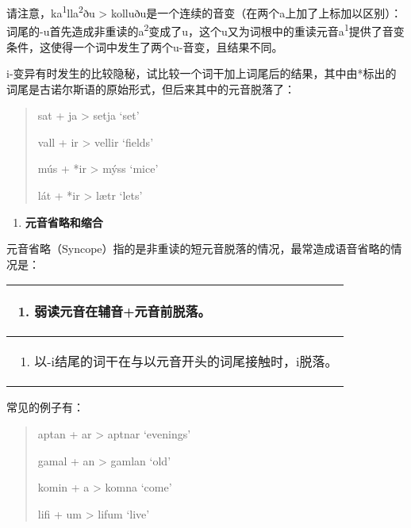 请注意，ka\textsuperscript{1}lla\textsuperscript{2}ðu \textgreater{}
kolluðu是一个连续的音变（在两个a上加了上标加以区别）：词尾的-u首先造成非重读的a\textsuperscript{2}变成了u，这个u又为词根中的重读元音a\textsuperscript{1}提供了音变条件，这使得一个词中发生了两个u-音变，且结果不同。

i-变异有时发生的比较隐秘，试比较一个词干加上词尾后的结果，其中由*标出的词尾是古诺尔斯语的原始形式，但后来其中的元音脱落了：

\begin{quote}
  sat + ja \textgreater{} setja `set'

  vall + ir \textgreater{} vellir `fields'

  mús + *ir \textgreater{} mýss `mice'

  lát + *ir \textgreater{} lætr `lets'
\end{quote}

\begin{enumerate}
  \def\labelenumi{\Alph{enumi}.}
  \setcounter{enumi}{1}
  \item
        \label{_Ref115693879}{}\textbf{元音省略和缩合}
\end{enumerate}

元音省略（Syncope）指的是非重读的短元音脱落的情况，最常造成语音省略的情况是：

\begin{longtable}{l}
  \toprule
  \begin{enumerate}\def\labelenumi{\arabic{enumi}.}\item  {}\label{_Ref115694569}{}弱读元音在辅音+元音前脱落。\end{enumerate} \\
  \midrule
  \endhead
  \bottomrule
  \endfoot
  \begin{minipage}[t]{\linewidth}\raggedright
    \begin{enumerate}
      \def\labelenumi{\arabic{enumi}.}
      \setcounter{enumi}{1}
      \item
            \label{_Ref115709879}{}以-i结尾的词干在与以元音开头的词尾接触时，i脱落。
    \end{enumerate}
  \end{minipage}                                                                                                        \\
\end{longtable}

常见的例子有：

\begin{quote}
  aptan + ar \textgreater{} aptnar `evenings'

  gamal + an \textgreater{} gamlan `old'

  komin + a \textgreater{} komna `come'

  lifi + um \textgreater{} lifum `live'
\end{quote}

